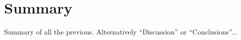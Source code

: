 \documentclass[english,12pt,a4paper,pdftex,elec,utf8]{aaltothesis}
\begin{document}
\clearpage

\section{Summary} \label{summarysection}


Summary of all the previous. Alternatively ``Discussion'' or ``Conclusions''...


\clearpage

\thesisbibliography

%



\printbibliography




\clearpage

\thesisappendix

%
\end{document}
